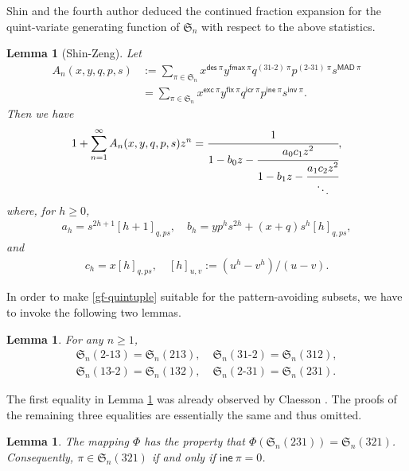 \documentclass[12pt,reqno]{amsart}
\numberwithin{equation}{section}
\theoremstyle{plain}
\newtheorem{lemma}[theorem]{Lemma}
\theoremstyle{definition}
\def\S{\mathfrak{S}}
\def\exc{\mathsf{exc}}
\def\des{\mathsf{des}}
\def\inv{\mathsf{inv}}
\def\fix{\mathsf{fix}}
\def\fmax{\mathsf{fmax}}
\def\icr{\mathsf{icr}}
\def\ine{\mathsf{ine}}
\def\MAD{\mathsf{MAD}}
\def\cab{31\text{-}2}
\def\bca{2\text{-}31}
\def\acb{13\text{-}2}
\def\bac{2\text{-}13}
\begin{document}
Shin and the fourth author \cite{SZ10} deduced the continued fraction expansion for the quint-variate generating function of $\S_n$ with respect to the above statistics.
\begin{lemma}[Shin-Zeng]\label{Lemma:Shin-Zeng}
Let
\begin{align}\label{gf-quintuple}
A_n(x,y,q,p,s)&:=\sum_{\pi\in\S_n}x^{\des\:\pi}y^{\fmax\:\pi}q^{(\cab)\:\pi}p^{(\bca)\:\pi}s^{\MAD\:\pi}\nonumber \\
&=\sum_{\pi\in\S_n}x^{\exc\:\pi}y^{\fix\:\pi}q^{\icr\:\pi}p^{\ine\:\pi}s^{\inv\:\pi}.
\end{align}
Then we have
\begin{align}\label{cf-quintuple}
1+\sum_{n=1}^{\infty}A_n(x,y,q,p,s)z^n=\cfrac{1}{1-b_0z-\cfrac{a_0c_1z^2}{1-b_1z-\cfrac{a_1c_2z^2}{\ddots}}},
\end{align}
where, for $h\ge 0$,
\begin{align*}
a_h=s^{2h+1}[h+1]_{q,ps}, \quad b_h=yp^hs^{2h}+(x+q)s^h[h]_{q,ps},
\end{align*}
and
\begin{align*}
c_h=x[h]_{q,ps},\quad [h]_{u,v}:=(u^{h}-v^{h})/(u-v).
\end{align*}
\end{lemma}




















 In order to make \eqref{gf-quintuple} suitable for the pattern-avoiding subsets, we have to invoke the following two lemmas.

\begin{lemma}\label{231-321}
For any $n\geq1$,
\begin{align*}
\S_n(\bac)=\S_n(213),\; &\S_n(\cab)=\S_n(312), \\
\S_n(\acb)=\S_n(132),\; &\S_n(\bca)=\S_n(231).
\end{align*}
\end{lemma}
The first equality in Lemma \ref{231-321} was already observed by Claesson \cite{Cla}. The proofs of the remaining three equalities are essentially the same and thus omitted.



\begin{lemma}\label{321-iff-ine=0}
The mapping $\varPhi$ has the property that  $\varPhi(\S_{n}(231))=\S_n(321)$. Consequently, $\pi\in\S_n(321)$ if and only if $\ine\:\pi=0$.
\end{lemma}
\end{document}
